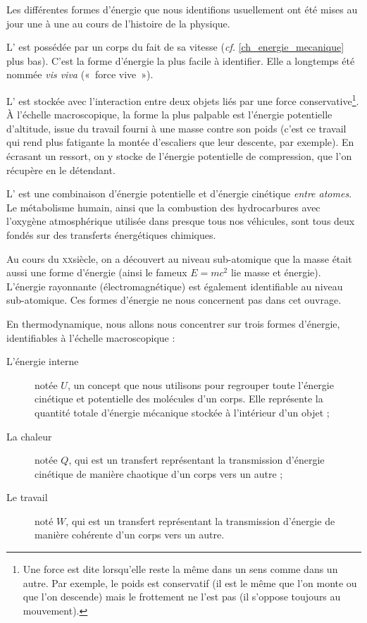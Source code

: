 		Les différentes formes d’énergie que nous identifions usuellement ont été mises au jour une à une au cours de l’histoire de la physique.
		
		L’ est possédée par un corps du fait de sa vitesse (\textit{cf.} \cref{ch_energie_mecanique} plus bas). C’est la forme d’énergie la plus facile à identifier. Elle a longtemps été nommée \textit{vis viva} («~force vive~»).
		
		L’ est stockée avec l’interaction entre deux objets liés par une force conservative\footnote{Une force est dite  lorsqu’elle reste la même dans un sens comme dans un autre. Par exemple, le poids est conservatif (il est le même que l’on monte ou que l’on descende) mais le frottement ne l’est pas (il s’oppose toujours au mouvement).}. À l’échelle macroscopique, la forme la plus palpable est l’énergie potentielle d’altitude, issue du travail fourni à une masse contre son poids (c’est ce travail qui rend plus fatigante la montée d’escaliers que leur descente, par exemple). En écrasant un ressort, on y stocke de l’énergie potentielle de compression, que l’on récupère en le détendant.

		L’ est une combinaison d’énergie potentielle et d’énergie cinétique \emph{entre atomes}. Le métabolisme humain, ainsi que la combustion des hydrocarbures avec l’oxygène atmosphérique utilisée dans presque tous nos véhicules, sont tous deux fondés sur des transferts énergétiques chimiques.
		
		Au cours du \textsc{xx}\ieme siècle, on a découvert au niveau sub-atomique que la masse était aussi une forme d’énergie (ainsi le fameux $E = m c^2$ lie masse et énergie). L’énergie rayonnante (électromagnétique) est également identifiable au niveau sub-atomique. Ces formes d’énergie ne nous concernent pas dans cet ouvrage.

		En thermodynamique, nous allons nous concentrer sur trois formes d’énergie, identifiables à l’échelle macroscopique :
		
		\begin{description}
			\item [L’énergie interne] notée $U$, un concept que nous utilisons pour regrouper toute l’énergie cinétique et potentielle des molécules d’un corps. Elle représente la quantité totale d’énergie mécanique stockée à l’intérieur d’un objet ;
			\item [La chaleur] notée $Q$, qui est un transfert représentant la transmission d’énergie cinétique de manière chaotique d’un corps vers un autre ;
			\item [Le travail] noté $W$, qui est un transfert représentant la transmission d’énergie de manière cohérente d’un corps vers un autre.
		\end{description}

